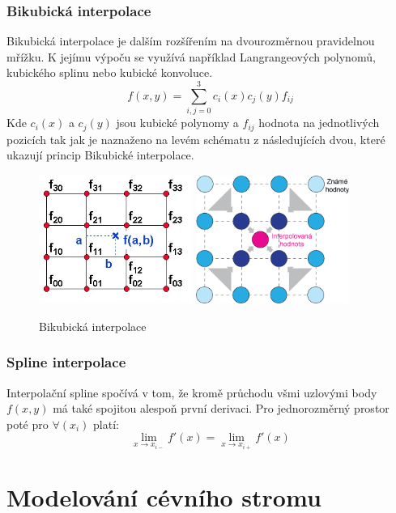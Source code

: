 \documentclass{thesis}%
\begin{document}
 \subsection{Bikubická interpolace}
 Bikubická interpolace je dalším rozšířením na  dvourozměrnou pravidelnou mřížku. K jejímu výpoču se využívá například Langrangeových polynomů, kubického splinu nebo kubické konvoluce.
 \begin{equation}
f(x,y) = \sum\limits_{i,j=0}^3 c_{i}(x)c_{j}(y)f_{ij}
\end{equation}
Kde $c_{i}(x)$ a $c_{j}(y)$  jsou kubické polynomy a $f_{ij}$ hodnota na jednotlivých pozicích tak jak je naznaženo na levém schématu z následujících dvou, které ukazují princip Bikubické interpolace.
 \begin{figure}[ht!]
  \centering
	\includegraphics[width=5cm]{bikubicka2.png}
	\includegraphics[width=5cm]{bikubicka.png}
	\caption[Bikubická interpolace]{Bikubická interpolace}
\end{figure}
 \subsection{Spline interpolace}
 Interpolační spline spočívá v tom, že kromě průchodu všmi uzlovými body $f(x,y)$ má také spojitou alespoň první derivaci. Pro jednorozměrný prostor poté pro $\forall (x_{i})$ platí:
\begin{equation}
\lim_{x\rightarrow x_{i-}}  f'(x) = \lim_{x\rightarrow x_{i+}} f'(x)
\end{equation}

\chapter{Modelování cévního stromu}
\end{document}
